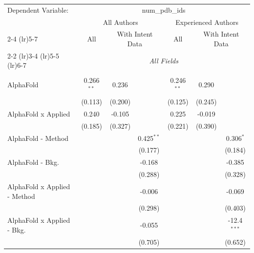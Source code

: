 \begingroup
\centering
\begin{tabular}{lcccccc}
   \tabularnewline \midrule \midrule
   Dependent Variable: & \multicolumn{6}{c}{num\_pdb\_ids}\\
 & \multicolumn{3}{c}{All Authors} & \multicolumn{3}{c}{Experienced Authors} \\
\cmidrule(lr){2-4} \cmidrule(lr){5-7}
 & \multicolumn{1}{c}{All} & \multicolumn{2}{c}{With Intent Data} & \multicolumn{1}{c}{All} & \multicolumn{2}{c}{With Intent Data} \\
\cmidrule(lr){2-2} \cmidrule(lr){3-4} \cmidrule(lr){5-5} \cmidrule(lr){6-7}
 & \multicolumn{6}{c}{\textit{All Fields}} \\ \\
   AlphaFold                      & 0.266$^{**}$ & 0.236        &               & 0.246$^{**}$ & 0.290        &   \\   
                                  & (0.113)      & (0.200)      &               & (0.125)      & (0.245)      &   \\   
   AlphaFold x Applied            & 0.240        & -0.105       &               & 0.225        & -0.019       &   \\   
                                  & (0.185)      & (0.327)      &               & (0.221)      & (0.390)      &   \\   
   AlphaFold - Method             &              &              & 0.425$^{**}$  &              &              & 0.306$^{*}$\\   
                                  &              &              & (0.177)       &              &              & (0.184)\\   
   AlphaFold - Bkg.               &              &              & -0.168        &              &              & -0.385\\   
                                  &              &              & (0.288)       &              &              & (0.328)\\   
   AlphaFold x Applied - Method   &              &              & -0.006        &              &              & -0.069\\   
                                  &              &              & (0.298)       &              &              & (0.403)\\   
   AlphaFold x Applied - Bkg.     &              &              & -0.055        &              &              & -12.4$^{***}$\\   
                                  &              &              & (0.705)       &              &              & (0.652)\\   

\end{tabular}

